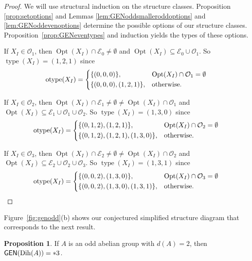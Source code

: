 \documentclass[12pt]{amsart}
\theoremstyle{definition}
\newtheorem{proposition}[equation]{Proposition}
\theoremstyle{definition}
\numberwithin{equation}{section}
\begin{document}
\begin{proof}
We will use structural induction on the structure classes. Proposition \ref{prop:setoptions} and Lemmas \ref{lem:GENoddsmalleroddoptions} 
and \ref{lem:GENoddevenoptions} determine the possible options of our structure classes. 
Proposition~\ref{prop:GENeventypes} and induction yields the types of these options.  

If $X_I\in\mathcal{O}_1$, then ${\operatorname{Opt}}(X_I)\cap \mathcal{E}_0\ne \emptyset$ and ${\operatorname{Opt}}(X_I)\subseteq\mathcal{E}_0\cup \mathcal{O}_1$.  
So ${\operatorname{type}}(X_I)=(1,2,1)$ since
\[
{\operatorname{otype}}(X_I)=
\begin{dcases}
\{(0,0,0)\},          & {\operatorname{Opt}}(X_I)\cap \mathcal{O}_1 = \emptyset \\
\{(0,0,0),(1,2,1)\},  & \text{otherwise}.
\end{dcases}
\]

If $X_I\in\mathcal{O}_2$, then ${\operatorname{Opt}}(X_I) \cap \mathcal{E}_1 \ne \emptyset\ne {\operatorname{Opt}}(X_I)\cap \mathcal{O}_1$ 
and ${\operatorname{Opt}}(X_I)\subseteq\mathcal{E}_1\cup\mathcal{O}_1\cup \mathcal{O}_2$. 
So ${\operatorname{type}}(X_I)=(1,3,0)$ since
\[
{\operatorname{otype}}(X_I)=
\begin{dcases}
\{(0,1,2),(1,2,1)\},          & {\operatorname{Opt}}(X_I) \cap \mathcal{O}_2 = \emptyset \\
\{(0,1,2),(1,2,1),(1,3,0)\},  & \text{otherwise}.
\end{dcases}
\]

If $X_I\in\mathcal{O}_3$, then ${\operatorname{Opt}}(X_I)\cap \mathcal{E}_2 \ne \emptyset\ne {\operatorname{Opt}}(X_I)\cap \mathcal{O}_2$ 
and ${\operatorname{Opt}}(X_I)\subseteq\mathcal{E}_2\cup\mathcal{O}_2\cup \mathcal{O}_3$. 
So ${\operatorname{type}}(X_I)=(1,3,1)$ since
\[
{\operatorname{otype}}(X_I)=
\begin{dcases}
\{(0,0,2), (1,3,0)\},         & {\operatorname{Opt}}(X_I) \cap \mathcal{O}_3 = \emptyset \\
\{(0,0,2),(1,3,0),(1,3,1)\},  & \text{otherwise}.
\end{dcases}
\]
\end{proof}

Figure~\ref{fig:genodd}(b) shows our conjectured simplified structure diagram that corresponds to the next result.

\begin{proposition}\label{prop:Odd2Generated}
If $A$ is an odd abelian group with $d(A)=2$, then ${\text{\sf GEN}}({\operatorname{Dih}}(A))=*3$.
\end{proposition}
\end{document}
